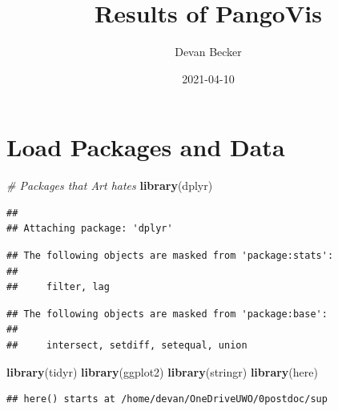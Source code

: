 \documentclass[
]{article}
\title{Results of PangoVis}
\author{Devan Becker}
\date{2021-04-10}
\newenvironment{Shaded}{\begin{snugshade}}{\end{snugshade}}
\newcommand{\CommentTok}[1]{\textcolor[rgb]{0.56,0.35,0.01}{\textit{#1}}}
\newcommand{\KeywordTok}[1]{\textcolor[rgb]{0.13,0.29,0.53}{\textbf{#1}}}
\newcommand{\NormalTok}[1]{#1}
\begin{document}
\maketitle

\hypertarget{load-packages-and-data}{%
\section{Load Packages and Data}\label{load-packages-and-data}}

\begin{Shaded}
\begin{Highlighting}[]
\CommentTok{\# Packages that Art hates}
\KeywordTok{library}\NormalTok{(dplyr)}
\end{Highlighting}
\end{Shaded}

\begin{verbatim}
## 
## Attaching package: 'dplyr'
\end{verbatim}

\begin{verbatim}
## The following objects are masked from 'package:stats':
## 
##     filter, lag
\end{verbatim}

\begin{verbatim}
## The following objects are masked from 'package:base':
## 
##     intersect, setdiff, setequal, union
\end{verbatim}

\begin{Shaded}
\begin{Highlighting}[]
\KeywordTok{library}\NormalTok{(tidyr)}
\KeywordTok{library}\NormalTok{(ggplot2)}
\KeywordTok{library}\NormalTok{(stringr)}
\KeywordTok{library}\NormalTok{(here)}
\end{Highlighting}
\end{Shaded}

\begin{verbatim}
## here() starts at /home/devan/OneDriveUWO/0postdoc/sup
\end{verbatim}
\end{document}
